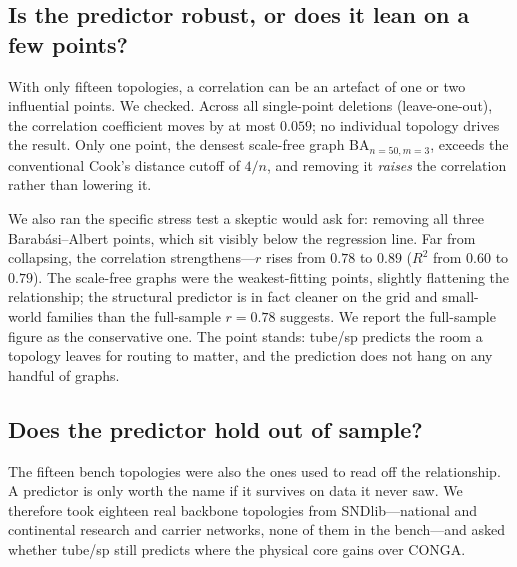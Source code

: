 \subsection{Is the predictor robust, or does it lean on a few points?}
\label{sec:leverage}

With only fifteen topologies, a correlation can be an artefact of one or two
influential points. We checked. Across all single-point deletions
(leave-one-out), the correlation coefficient moves by at most $0.059$; no
individual topology drives the result. Only one point, the densest scale-free
graph BA$_{n=50,m=3}$, exceeds the conventional Cook's distance cutoff of
$4/n$, and removing it \emph{raises} the correlation rather than lowering it.

We also ran the specific stress test a skeptic would ask for: removing all three
Barab\'asi--Albert points, which sit visibly below the regression line. Far from
collapsing, the correlation strengthens---$r$ rises from $0.78$ to $0.89$
($R^2$ from $0.60$ to $0.79$). The scale-free graphs were the weakest-fitting
points, slightly flattening the relationship; the structural predictor is in
fact cleaner on the grid and small-world families than the full-sample $r=0.78$
suggests. We report the full-sample figure as the conservative one. The point
stands: tube/sp predicts the room a topology leaves for routing to matter, and
the prediction does not hang on any handful of graphs.

\subsection{Does the predictor hold out of sample?}
\label{sec:oos}

The fifteen bench topologies were also the ones used to read off the
relationship. A predictor is only worth the name if it survives on data it
never saw. We therefore took eighteen real backbone topologies from
SNDlib---national and continental research and carrier networks, none of them
in the bench---and asked whether tube/sp still predicts where the physical core
gains over CONGA.

